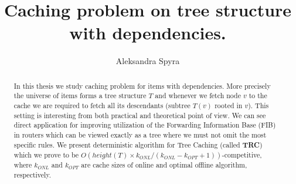 \documentclass[a4paper,10pt]{article}
\title{Caching problem on tree structure with dependencies.}
\author{Aleksandra Spyra}
\begin{document}
\maketitle

\begin{abstract}
In this thesis we study caching problem for items with dependencies.
More precisely the universe of items forms a tree structure $T$ and whenever
we fetch node $v$ to the cache we are required to fetch all its descendants
(subtree $T(v)$ rooted in $v$). This setting is interesting from both practical 
and theoretical point of view. We can see direct application for improving 
utilization of the Forwarding Information Base (FIB) in routers which can be 
viewed exactly as a tree where we must not omit the most specific rules. We 
present deterministic algorithm for Tree Caching (called \textbf{TRC}) which we 
prove to be $O(height(T) \times k_{ONL}/(k_{ONL} - k_{OPT} + 1))$-competitive, 
where $k_{ONL}$ and $k_{OPT}$ are cache sizes of online and optimal offline 
algorithm, respectively. 
\end{abstract}

\tableofcontents





\end{document}

